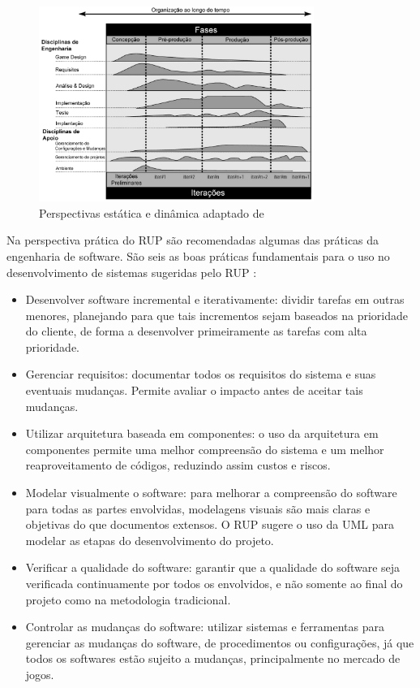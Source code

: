 \documentclass[quali]{ppgccufscar}
\begin{document}
\begin{figure}[!htbp]
	\begin{center}
	\caption{Perspectivas estática e dinâmica adaptado de }
	\label{fig_rup}
	\includegraphics[width=0.8\textwidth,natwidth=1200,natheight=850]{figura5.jpg}
	\end{center}
\end{figure}

Na perspectiva prática do RUP são recomendadas algumas das práticas da engenharia de software. São seis as boas práticas fundamentais para o uso no desenvolvimento de sistemas sugeridas pelo RUP \cite{sommerville2010}:

\begin{itemize}
	\item Desenvolver software incremental e iterativamente: dividir tarefas em outras menores, planejando para que tais incrementos sejam baseados na prioridade do cliente, de forma a desenvolver primeiramente as tarefas com alta prioridade.
	\item Gerenciar requisitos: documentar todos os requisitos do sistema e suas eventuais mudanças. Permite avaliar o impacto antes de aceitar tais mudanças.
	\item Utilizar arquitetura baseada em componentes: o uso da arquitetura em componentes permite uma melhor compreensão do sistema e um melhor reaproveitamento de códigos, reduzindo assim custos e riscos.
	\item Modelar visualmente o software: para melhorar a compreensão do software para todas as partes envolvidas, modelagens visuais são mais claras e objetivas do que documentos extensos. O RUP sugere o uso da UML para modelar as etapas do desenvolvimento do projeto.
	\item Verificar a qualidade do software: garantir que a qualidade do software seja verificada continuamente por todos os envolvidos, e não somente ao final do projeto como na metodologia tradicional.
	\item Controlar as mudanças do software: utilizar sistemas e ferramentas para gerenciar as mudanças do software, de procedimentos ou configurações, já que todos os softwares estão sujeito a mudanças, principalmente no mercado de jogos.
\end{itemize}
\end{document}
